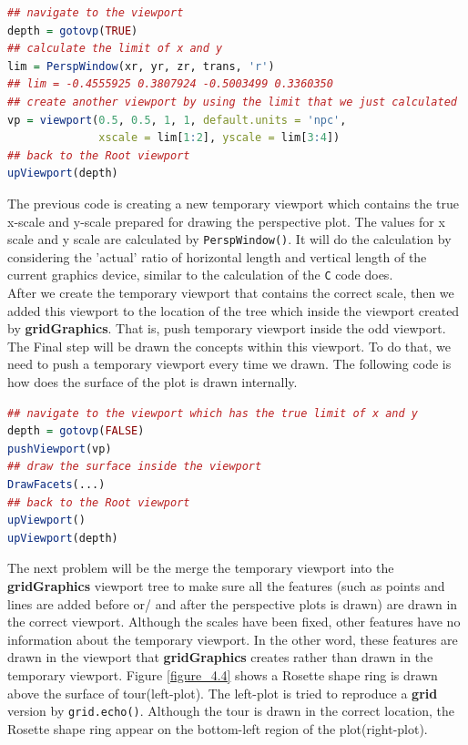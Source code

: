 \documentclass[11pt]{report}
\begin{document}
\newpage
\begin{lstlisting}[language = R]
## navigate to the viewport
depth = gotovp(TRUE) 
## calculate the limit of x and y
lim = PerspWindow(xr, yr, zr, trans, 'r')
## lim = -0.4555925 0.3807924 -0.5003499 0.3360350
## create another viewport by using the limit that we just calculated
vp = viewport(0.5, 0.5, 1, 1, default.units = 'npc',
              xscale = lim[1:2], yscale = lim[3:4]) 
## back to the Root viewport
upViewport(depth)  
\end{lstlisting}
The previous code is creating a new temporary viewport which contains the true x-scale and y-scale prepared for drawing the perspective plot. The values for x scale and y scale are calculated by \texttt{PerspWindow()}. It will do the calculation by considering the 'actual' ratio of horizontal length and vertical length of the current graphics device, similar to the calculation of the \texttt{C} code does.\\

After we create the temporary viewport that contains the correct scale, then we added this viewport to the location of the tree which inside the viewport created by \textbf{gridGraphics}. That is, push temporary viewport inside the odd viewport. The Final step will be drawn the concepts within this viewport. To do that, we need to push a temporary viewport every time we drawn. The following code is how does the surface of the plot is drawn internally.

\begin{lstlisting}[language = R]
## navigate to the viewport which has the true limit of x and y
depth = gotovp(FALSE)
pushViewport(vp)
## draw the surface inside the viewport
DrawFacets(...)
## back to the Root viewport
upViewport()
upViewport(depth)
\end{lstlisting}

The next problem will be the merge the temporary viewport into the \textbf{gridGraphics} viewport tree to make sure all the features (such as points and lines are added before or/ and after the perspective plots is drawn) are drawn in the correct viewport. Although the scales have been fixed, other features have no information about the temporary viewport. In the other word, these features are drawn in the viewport that \textbf{gridGraphics} creates rather than drawn in the temporary viewport. Figure \ref{figure_4.4} shows a Rosette shape ring is drawn above the surface of tour(left-plot). The left-plot is tried to reproduce a \textbf{grid} version by \texttt{grid.echo()}. Although the tour is drawn in the correct location, the Rosette shape ring appear on the bottom-left region of the plot(right-plot). \\
\end{document}
